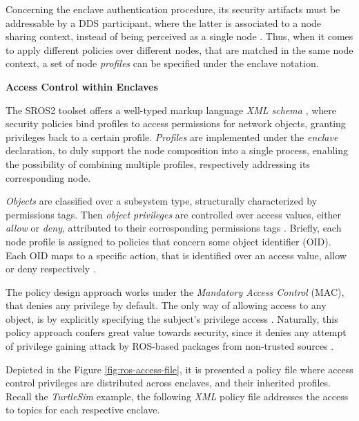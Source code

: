 Concerning the enclave authentication procedure, its security artifacts must be addressable by a DDS participant, where the latter is associated to a node sharing context, instead of being perceived as a single node \cite{ros-security-enclaves}. Thus, when it comes to apply different policies over different nodes, that are matched in the same node context, a set of node \textit{profiles} can be specified under the enclave notation. 
 
\vspace{0.5cm}
\textbf{Access Control within Enclaves}

The SROS2 toolset offers a well-typed markup language \textit{XML schema} \cite{ros-access-control}, where security policies bind profiles to access permissions for network objects, granting privileges back to a certain profile. \textit{Profiles} are implemented under the \textit{enclave} declaration, to duly support the node composition into a single process, enabling the possibility of combining multiple profiles, respectively addressing its corresponding node. %

\textit{Objects} are classified over a subsystem type, structurally characterized by permissions tags. Then \textit{object privileges} are controlled over access values, either \textit{allow} or \textit{deny}, attributed to their corresponding permissions tags \cite{ros-access-control, white2018procedurally}. Briefly, each node profile is assigned to policies that concern some object identifier (OID). Each OID maps to a specific action, that is identified over an access value, allow or deny respectively \cite{white2016sros}.

The policy design approach works under the \textit{Mandatory Access Control} (MAC), that denies any privilege by default. The only way of allowing access to any object, is by explicitly specifying the subject's privilege access \cite{ros-access-control, white2018procedurally, white2016sros}. Naturally, this policy approach confers great value towards security, since it denies any attempt of privilege gaining attack by ROS-based packages from non-trusted sources \cite{white2016sros}.

Depicted in the Figure \ref{fig:ros-access-file}, it is presented a policy file where access control privileges are distributed across enclaves, and their inherited profiles. Recall the \textit{TurtleSim} example, the following \textit{XML} policy file addresses the access to topics for each respective enclave. 


